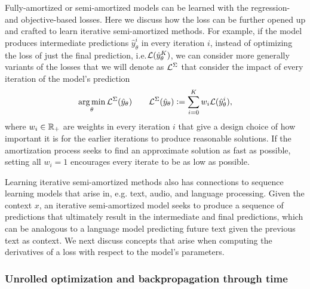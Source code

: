 \documentclass[twoside,11pt]{article}
\newcommand{\eg}{e.g.\xspace}
\newcommand{\ie}{i.e.\xspace}
\begin{document}
Fully-amortized or semi-amortized models can be learned
with the regression- and objective-based losses.
Here we discuss how the loss can be further opened up
and crafted to learn iterative semi-amortized methods.
For example, if the model produces intermediate predictions
$\hat y_\theta^i$ in every iteration $i$, instead of
optimizing the loss of just the final prediction,
\ie ${\mathcal{L}}(\hat y_\theta^K)$, we can consider more generally
variants of the losses that we will denote as
${\mathcal{L}}^\Sigma$ that consider the impact of every iteration
of the model's prediction
\begin{equation}
  \operatorname*{arg\,min}_\theta {\mathcal{L}}^\Sigma(\hat y_\theta) \qquad {\mathcal{L}}^\Sigma(\hat y_\theta) \vcentcolon= \sum_{i=0}^K w_i {\mathcal{L}}(\hat y_\theta^i),
\label{eq:iter-loss}
\end{equation}
where $w_i\in\mathbb{R}_+$ are weights in every iteration $i$
that give a design choice of how important
it is for the earlier iterations to produce reasonable
solutions.
If the amortization process seeks to find an approximate
solution as fast as possible, setting all $w_i=1$
encourages every iterate to be as low as possible.

Learning iterative semi-amortized methods also has connections to
sequence learning models that arise in, \eg text, audio,
and language processing.
Given the context $x$, an iterative semi-amortized model
seeks to produce a sequence of predictions that ultimately
result in the intermediate and final predictions,
which can be analogous to a language model predicting
future text given the previous text as context.
We next discuss concepts that arise when computing the derivatives
of a loss with respect to the model's parameters.

\subsubsection{Unrolled optimization and backpropagation through time}
\label{sec:unrolled}
\begin{center}
\end{center}
\vspace{-7mm}
\end{document}
